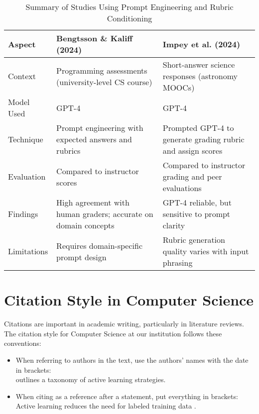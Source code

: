 \begin{table}[h]
  \centering
  \caption{Summary of Studies Using Prompt Engineering and Rubric Conditioning}
  \label{tab:prompt_rubric_conditioning}
  \begin{tabular}{@{}p{3.5cm}p{6.5cm}p{6.5cm}@{}}
  \toprule
  \textbf{Aspect} & \textbf{Bengtsson \& Kaliff (2024)} & \textbf{Impey et al. (2024)} \\
  \midrule
  Context & Programming assessments (university-level CS course) & Short-answer science responses (astronomy MOOCs) \\
  \midrule
  Model Used & GPT-4 & GPT-4 \\
  \midrule
  Technique & Prompt engineering with expected answers and rubrics & Prompted GPT-4 to generate grading rubric and assign scores \\
  \midrule
  Evaluation & Compared to instructor scores & Compared to instructor grading and peer evaluations \\
  \midrule
  Findings & High agreement with human graders; accurate on domain concepts & GPT-4 reliable, but sensitive to prompt clarity \\
  \midrule
  Limitations & Requires domain-specific prompt design & Rubric generation quality varies with input phrasing \\
  \bottomrule
  \end{tabular}
\end{table}
  
\section{Citation Style in Computer Science}
Citations are important in academic writing, particularly in literature reviews. The citation style for Computer Science at our institution follows these conventions:

\begin{itemize}
\item When referring to authors in the text, use the authors' names with the date in brackets:\\
\citet{settles2010} outlines a taxonomy of active learning strategies.

\item When citing as a reference after a statement, put everything in brackets:\\
Active learning reduces the need for labeled training data \citep{firoozi2023}.
\end{itemize}

